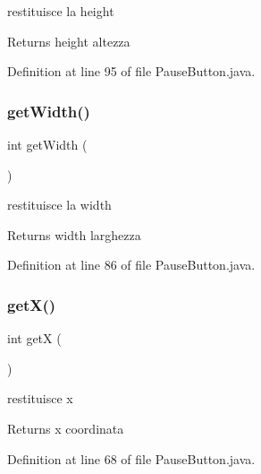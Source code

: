 restituisce la height 

\begin{DoxyReturn}{Returns}
height altezza 
\end{DoxyReturn}


Definition at line 95 of file Pause\+Button.\+java.

\mbox{\label{classui_1_1_pause_button_a67a0997183f24da19b776d96c1052998}} 
\subsubsection{\texorpdfstring{get\+Width()}{getWidth()}}
{\footnotesize\ttfamily int get\+Width (\begin{DoxyParamCaption}{ }\end{DoxyParamCaption})}



restituisce la width 

\begin{DoxyReturn}{Returns}
width larghezza 
\end{DoxyReturn}


Definition at line 86 of file Pause\+Button.\+java.

\mbox{\label{classui_1_1_pause_button_ae13f88e922e1339355456062ad9fa359}} 
\subsubsection{\texorpdfstring{get\+X()}{getX()}}
{\footnotesize\ttfamily int getX (\begin{DoxyParamCaption}{ }\end{DoxyParamCaption})}



restituisce x 

\begin{DoxyReturn}{Returns}
x coordinata 
\end{DoxyReturn}


Definition at line 68 of file Pause\+Button.\+java.

\mbox{\label{classui_1_1_pause_button_aab81944f0a14bba932c0931899951937}} 
